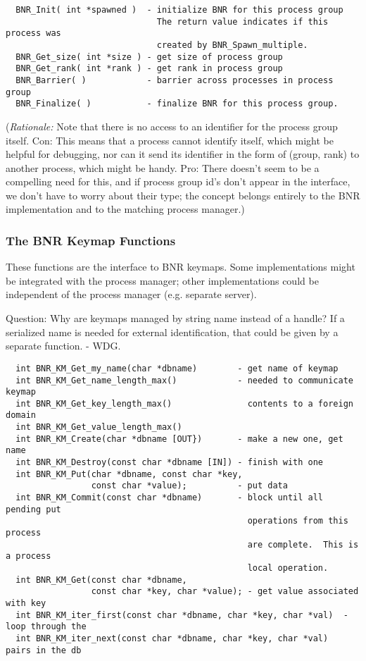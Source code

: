\documentclass{article}
\begin{document}
\begin{verbatim}
  BNR_Init( int *spawned )  - initialize BNR for this process group
                              The return value indicates if this process was
                              created by BNR_Spawn_multiple.
  BNR_Get_size( int *size ) - get size of process group
  BNR_Get_rank( int *rank ) - get rank in process group
  BNR_Barrier( )            - barrier across processes in process group
  BNR_Finalize( )           - finalize BNR for this process group.
\end{verbatim}

({\em Rationale:\/}  Note that there is no access to an identifier for the
process group itself.  Con:  This means that a process cannot identify itself,
which might be helpful for debugging, nor can it send its identifier in the
form of (group, rank) to another process, which might be handy.  Pro:  There
doesn't seem to be a compelling need for this, and if process group id's don't
appear in the interface, we don't have to worry about their type;  the concept
belongs entirely to the BNR implementation and to the matching process
manager.) 


\subsubsection{The BNR Keymap Functions}
\label{sec:bnr-keymap}

These functions are the interface to BNR keymaps.  Some implementations might
be integrated with the process manager; other implementations could be
independent of the process manager (e.g. separate server). 

Question: Why are keymaps managed by string name instead of a handle?
If a serialized name is needed for external identification, that could be 
given by a separate function.  - WDG.

\begin{verbatim}
  int BNR_KM_Get_my_name(char *dbname)        - get name of keymap
  int BNR_KM_Get_name_length_max()            - needed to communicate keymap
  int BNR_KM_Get_key_length_max()               contents to a foreign domain
  int BNR_KM_Get_value_length_max()
  int BNR_KM_Create(char *dbname [OUT})       - make a new one, get name 
  int BNR_KM_Destroy(const char *dbname [IN]) - finish with one 
  int BNR_KM_Put(char *dbname, const char *key,
                 const char *value);          - put data
  int BNR_KM_Commit(const char *dbname)       - block until all pending put
                                                operations from this process
                                                are complete.  This is a process
                                                local operation.
  int BNR_KM_Get(const char *dbname,
                 const char *key, char *value); - get value associated with key
  int BNR_KM_iter_first(const char *dbname, char *key, char *val)  - loop through the
  int BNR_KM_iter_next(const char *dbname, char *key, char *val)      pairs in the db
\end{verbatim}
  
\end{document}

